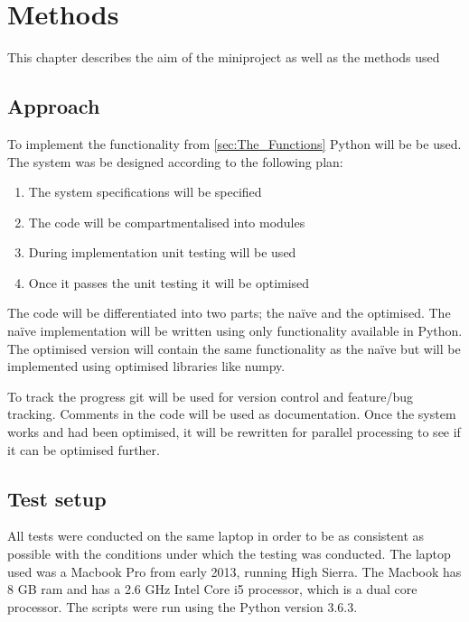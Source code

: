 \chapter{Methods}
This chapter describes the aim of the miniproject as well as the methods used 

\section{Approach} 
To implement the functionality from \autoref{sec:The_Functions} Python will be be used. The system was be designed according to the following plan:

\begin{enumerate}
 \item The system specifications will be specified
 \item The code will be compartmentalised into modules
 \item During implementation unit testing will be used
 \item Once it passes the unit testing it will be optimised
\end{enumerate}

The code will be differentiated into two parts; the na\"ive and the optimised. The na\"ive implementation will be written using only functionality available in Python. The optimised version will contain the same functionality as the na\"ive but will be implemented using optimised libraries like numpy.

To track the progress git will be used for version control and feature/bug tracking. Comments in the code will be used as documentation. Once the system works and had been optimised, it will be rewritten for parallel processing to see if it can be optimised further. 


\section{Test setup}
All tests were conducted on the same laptop in order to be as consistent as possible with the conditions under which the testing was conducted. The laptop used was a Macbook Pro from early 2013, running High Sierra. The Macbook has 8 GB ram and has a 2.6 GHz Intel Core i5 processor, which is a dual core processor. The scripts were run using the Python version 3.6.3. 